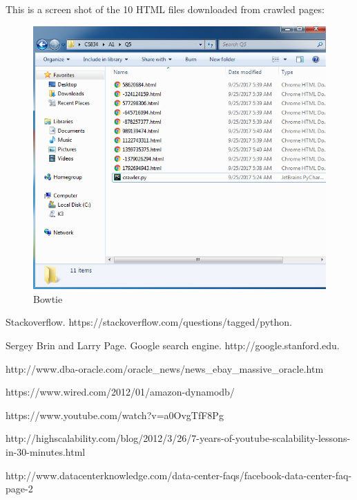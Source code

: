 \documentclass[a4paper, 11pt]{article}
\begin{document}
\pagebreak

This is a screen shot of the 10 HTML files downloaded from crawled pages:

\begin{figure}[h]
\caption{Bowtie}
\centering
\includegraphics[scale=0.7]{Q5/files.png}
\end{figure}

\begin{thebibliography}{9}

\bibitem{} 
Stackoverflow. https://stackoverflow.com/questions/tagged/python.

\bibitem{} 
Sergey Brin and Larry Page. Google search engine. http://google.stanford.edu.

\bibitem{}
http://www.dba-oracle.com/oracle\_news/news\_ebay\_massive\_oracle.htm

\bibitem{}
https://www.wired.com/2012/01/amazon-dynamodb/

\bibitem{}
https://www.youtube.com/watch?v=a0OvgTfF8Pg

\bibitem{}
http://highscalability.com/blog/2012/3/26/7-years-of-youtube-scalability-lessons-in-30-minutes.html

\bibitem{} http://www.datacenterknowledge.com/data-center-faqs/facebook-data-center-faq-page-2


\end{thebibliography}
\end{document}
